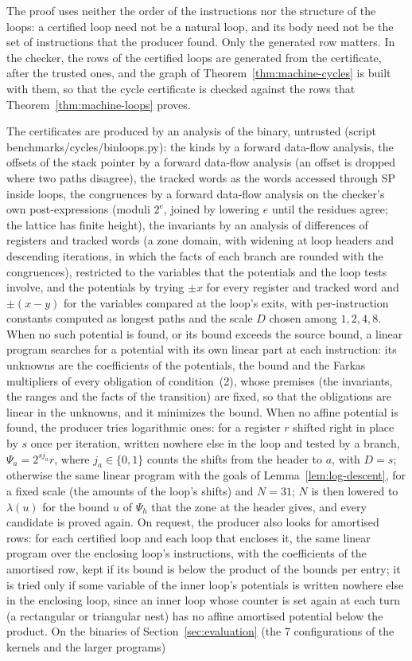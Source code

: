 \documentclass[oneside,english]{amsart}
\numberwithin{equation}{section}
\theoremstyle{plain}
\theoremstyle{definition}
\theoremstyle{plain}
\theoremstyle{plain}
\theoremstyle{remark}
\newcommand{\lean}[1]{{\ttfamily\small #1}}
\begin{document}
The proof uses neither the order of the instructions nor the structure of the loops: a certified loop need not be a natural loop, and its body need not be the set of instructions that the producer found. Only the generated row matters. In the checker, the rows of the certified loops are generated from the certificate, after the trusted ones, and the graph of Theorem~\ref{thm:machine-cycles} is built with them, so that the cycle certificate is checked against the rows that Theorem~\ref{thm:machine-loops} proves.

The certificates are produced by an analysis of the binary, untrusted (script \lean{benchmarks/cycles/binloops.py}): the kinds by a forward data-flow analysis, the offsets of the stack pointer by a forward data-flow analysis (an offset is dropped where two paths disagree), the tracked words as the words accessed through SP inside loops, the congruences by a forward data-flow analysis on the checker's own post-expressions (moduli $2^e$, joined by lowering $e$ until the residues agree; the lattice has finite height), the invariants by an analysis of differences of registers and tracked words (a zone domain, with widening at loop headers and descending iterations, in which the facts of each branch are rounded with the congruences), restricted to the variables that the potentials and the loop tests involve, and the potentials by trying $\pm x$ for every register and tracked word and $\pm (x - y)$ for the variables compared at the loop's exits, with per-instruction constants computed as longest paths and the scale $D$ chosen among $1, 2, 4, 8$. When no such potential is found, or its bound exceeds the source bound, a linear program searches for a potential with its own linear part at each instruction: its unknowns are the coefficients of the potentials, the bound and the Farkas multipliers of every obligation of condition~(2), whose premises (the invariants, the ranges and the facts of the transition) are fixed, so that the obligations are linear in the unknowns, and it minimizes the bound. When no affine potential is found, the producer tries logarithmic ones: for a register $r$ shifted right in place by $s$ once per iteration, written nowhere else in the loop and tested by a branch, $\Psi_a = 2^{s j_a} r$, where $j_a \in \{0, 1\}$ counts the shifts from the header to $a$, with $D = s$; otherwise the same linear program with the goals of Lemma~\ref{lem:log-descent}, for a fixed scale (the amounts of the loop's shifts) and $N = 31$; $N$ is then lowered to $\lambda(u)$ for the bound $u$ of $\Psi_h$ that the zone at the header gives, and every candidate is proved again. On request, the producer also looks for amortised rows: for each certified loop and each loop that encloses it, the same linear program over the enclosing loop's instructions, with the coefficients of the amortised row, kept if its bound is below the product of the bounds per entry; it is tried only if some variable of the inner loop's potentials is written nowhere else in the enclosing loop, since an inner loop whose counter is set again at each turn (a rectangular or triangular nest) has no affine amortised potential below the product. On the binaries of Section~\ref{sec:evaluation} (the 7 configurations of the kernels and the larger programs) 
\end{document}
